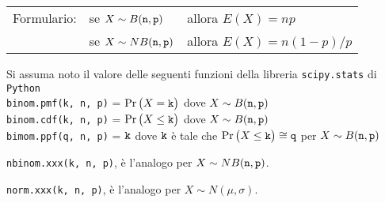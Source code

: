 \documentclass[11pt,twoside,a4paper]{article}
\begin{document}
\vfill\hrulefill\par
\begin{tabular}{@{}lll}
Formulario:& se $X\sim B({\tt n},{\tt p})$ & allora $E(X)=np$\\
           & se $X\sim NB({\tt n},{\tt p})$& allora $E(X)=n(1-p)/p$
\end{tabular}

Si assuma noto il valore delle seguenti funzioni della libreria {\tt scipy.stats\/} di  {\tt Python\/}\\
{\tt binom.pmf(k, n, p)} = $\Pr\big(X={\tt k}\big)$ dove $X\sim B({\tt n},{\tt p})$\\
{\tt binom.cdf(k, n, p)} = $\Pr\big(X\le{\tt k}\big)$ dove  $X\sim B({\tt n},{\tt p})$ \\
{\tt bimom.ppf(q, n, p)} = ${\tt k}$ dove ${\tt k}$ è tale che $\Pr\big(X\le{\tt k}\big)\cong{\tt q}$ per $X\sim B({\tt n},{\tt p})$ 

{\tt nbinom.xxx(k, n, p)}, è l'analogo per $X\sim NB({\tt n},{\tt p})$.

{\tt norm.xxx(k, n, p)}, è l'analogo per $X\sim N(\mu,\sigma)$.
\end{document}
